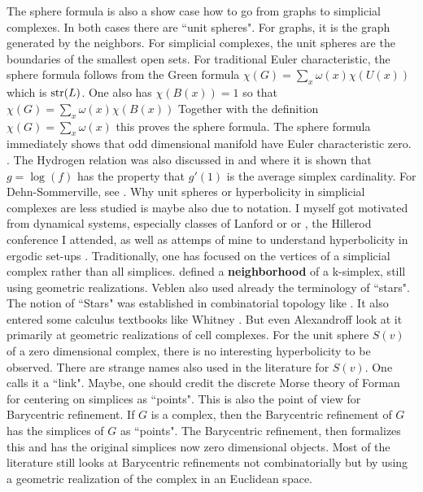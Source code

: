 \documentclass[12pt]{amsart}
\begin{document}
The sphere formula is also a show case how to go from 
graphs to simplicial complexes. In both cases there are 
``unit spheres". For graphs, it is the graph generated by the neighbors. 
For simplicial complexes, the unit spheres are the boundaries of the 
smallest open sets. For traditional Euler characteristic, the 
sphere formula follows from the Green formula 
$\chi(G) = \sum_{x} \omega(x) \chi(U(x))$ which is ${\rm str}(L)$.
One also has $\chi(B(x))=1$ so that $\chi(G)=\sum_x \omega(x) \chi(B(x))$ 
Together with the definition $\chi(G) = \sum_x \omega(x)$ this proves the
sphere formula. The sphere formula immediately shows that
odd dimensional manifold have Euler characteristic zero. 
\cite{KnillEnergy2020,Sphereformula}. The Hydrogen relation was also discussed in
\cite{DehnSommerville} and \cite{AverageSimplexCardinality} where it is
shown that $g=\log(f)$ has the property that $g'(1)$ is the average 
simplex cardinality.  For Dehn-Sommerville, see
\cite{Klee1964,NovikSwartz,MuraiNovik,LuzonMoron,BrentiWelker,Hetyei,Klain2002,BergerLadder}.
Why unit spheres or hyperbolicity in simplicial complexes are less studied is maybe also 
due to notation. I myself got motivated from dynamical systems, especially classes of Lanford
or \cite{Lan85} or \cite{Yoc95}, the Hillerod conference I attended, as well as attemps of 
mine to understand hyperbolicity in ergodic set-ups \cite{Kni91,knill_1992}.
Traditionally, one has focused on the vertices of a simplicial complex
rather than all simplices. 
\cite{Veblen} defined a {\bf neighborhood} of a k-simplex, still using
geometric realizations.  
Veblen also used already the terminology of ``stars".
The notion of ``Stars" was established  in combinatorial topology like \cite{Alexandroff1937} .
It also entered some calculus textbooks like Whitney \cite{Whitney1957}. 
But even Alexandroff look at it primarily at geometric realizations of cell complexes.
For the unit sphere $S(v)$ of a zero dimensional complex, there
is no interesting hyperbolicity to be observed. There are strange names  also used in the
literature for $S(v)$. One calls it a ``link". Maybe, one should credit the discrete
Morse theory of Forman for centering on simplices as ``points". This is also the 
point of view for Barycentric refinement. If $G$ is a complex, then the 
Barycentric refinement of $G$ has the simplices of $G$ as ``points". The Barycentric 
refinement, then formalizes this and has the original simplices now zero dimensional objects. 
Most of the literature still looks at Barycentric refinements not combinatorially but by using
a geometric realization of the complex in an Euclidean space.  \\
\end{document}
